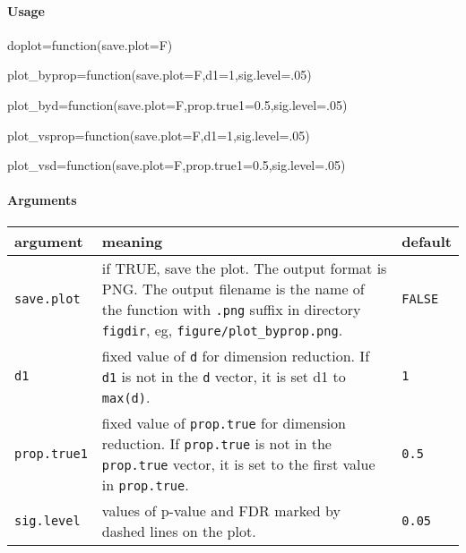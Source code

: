 \documentclass[]{article}
\newenvironment{Shaded}{\begin{snugshade}}{\end{snugshade}}
\newcommand{\DataTypeTok}[1]{\textcolor[rgb]{0.13,0.29,0.53}{{#1}}}
\newcommand{\DecValTok}[1]{\textcolor[rgb]{0.00,0.00,0.81}{{#1}}}
\newcommand{\FloatTok}[1]{\textcolor[rgb]{0.00,0.00,0.81}{{#1}}}
\newcommand{\NormalTok}[1]{{#1}}
\let\oldparagraph\paragraph
\renewcommand{\paragraph}[1]{\oldparagraph{#1}\mbox{}}
\begin{document}
\paragraph{Usage}\label{usage-3}

\begin{Shaded}
\begin{Highlighting}[]
\NormalTok{doplot=function(}\DataTypeTok{save.plot=}\NormalTok{F)}

\NormalTok{plot_byprop=function(}\DataTypeTok{save.plot=}\NormalTok{F,}\DataTypeTok{d1=}\DecValTok{1}\NormalTok{,}\DataTypeTok{sig.level=}\NormalTok{.}\DecValTok{05}\NormalTok{)}

\NormalTok{plot_byd=function(}\DataTypeTok{save.plot=}\NormalTok{F,}\DataTypeTok{prop.true1=}\FloatTok{0.5}\NormalTok{,}\DataTypeTok{sig.level=}\NormalTok{.}\DecValTok{05}\NormalTok{)}

\NormalTok{plot_vsprop=function(}\DataTypeTok{save.plot=}\NormalTok{F,}\DataTypeTok{d1=}\DecValTok{1}\NormalTok{,}\DataTypeTok{sig.level=}\NormalTok{.}\DecValTok{05}\NormalTok{)}

\NormalTok{plot_vsd=function(}\DataTypeTok{save.plot=}\NormalTok{F,}\DataTypeTok{prop.true1=}\FloatTok{0.5}\NormalTok{,}\DataTypeTok{sig.level=}\NormalTok{.}\DecValTok{05}\NormalTok{)}
\end{Highlighting}
\end{Shaded}

\paragraph{Arguments}\label{arguments-2}

\begingroup
\setlength{\tabcolsep}{10pt} \renewcommand{\arraystretch}{1.2}
\centering

\begin{tabular}{m{}m{}m{}}
\toprule
argument & meaning & default\\
\midrule
\texttt{save.plot} & if TRUE, save the plot. The output format is PNG. The output filename is the name of the function with \texttt{.png} suffix  in directory \texttt{figdir}, eg, \texttt{figure/plot\_byprop.png}. & \texttt{FALSE} \\
\texttt{d1} & fixed value of \texttt{d} for dimension reduction. If \texttt{d1} is not in the \texttt{d} vector, it is set d1 to \texttt{max(d)}. & \texttt{1} \\
\texttt{prop.true1} & fixed value of \texttt{prop.true} for dimension reduction. If \texttt{prop.true} is not in the \texttt{prop.true} vector, it is set to the first value in \texttt{prop.true}. & \texttt{0.5} \\
\texttt{sig.level} & values of p-value and FDR marked by dashed lines on the plot. & \texttt{0.05} \\
\bottomrule
\end{tabular}
\end{document}
